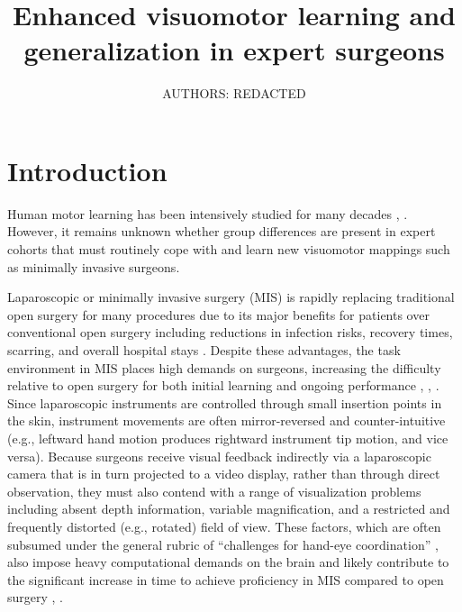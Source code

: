 \documentclass[man, 11pt, longtable, floatsintext, notab]{apa6}
\title{\textbf{Enhanced visuomotor learning and
    generalization in expert surgeons}}
\author{AUTHORS: REDACTED}
\affiliation{AFFILIATIONS: REDACTED}
\begin{document}
\maketitle

\section{Introduction}
Human motor learning has been intensively studied for many
decades \cite{shadmehr_error_2010},
\cite{krakauer_human_2011}. However, it remains unknown
whether group differences are present in expert cohorts that
must routinely cope with and learn new visuomotor mappings
such as minimally invasive surgeons.

Laparoscopic or minimally invasive surgery (MIS) is rapidly
replacing traditional open surgery for many procedures due
to its major benefits for patients over conventional open
surgery including reductions in infection risks, recovery
times, scarring, and overall hospital stays
\cite{cuschieri_whither_1995}. Despite these advantages, the
task environment in MIS places high demands on surgeons,
increasing the difficulty relative to open surgery for both
initial learning \cite{braga_laparoscopic_2002} and ongoing
performance \cite{cuschieri_whither_1995},
\cite{den_boer_problems_2001}, \cite{joice_ergonomic_1998}.
Since laparoscopic instruments are controlled through small
insertion points in the skin, instrument movements are often
mirror-reversed and counter-intuitive (e.g., leftward hand
motion produces rightward instrument tip motion, and vice
versa). Because surgeons receive visual feedback indirectly
via a laparoscopic camera that is in turn projected to a
video display, rather than through direct observation, they
must also contend with a range of visualization problems
including absent depth information, variable magnification,
and a restricted and frequently distorted (e.g., rotated)
field of view. These factors, which are often subsumed under
the general rubric of ``challenges for hand-eye
coordination'' \cite{wentink_eye-hand_2001}, also impose
heavy computational demands on the brain and likely
contribute to the significant increase in time to achieve
proficiency in MIS compared to open surgery
\cite{rattner_beyond_1999}, \cite{schauer_learning_2003}.
\end{document}
